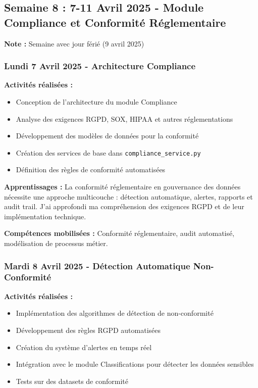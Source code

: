 \subsection{Semaine 8 : 7-11 Avril 2025 - Module Compliance et Conformité Réglementaire}

\textbf{Note :} Semaine avec jour férié (9 avril 2025)

\subsubsection{Lundi 7 Avril 2025 - Architecture Compliance}

\textbf{Activités réalisées :}
\begin{itemize}
    \item Conception de l'architecture du module Compliance
    \item Analyse des exigences RGPD, SOX, HIPAA et autres réglementations
    \item Développement des modèles de données pour la conformité
    \item Création des services de base dans \texttt{compliance\_service.py}
    \item Définition des règles de conformité automatisées
\end{itemize}

\textbf{Apprentissages :}
La conformité réglementaire en gouvernance des données nécessite une approche multicouche : détection automatique, alertes, rapports et audit trail. J'ai approfondi ma compréhension des exigences RGPD et de leur implémentation technique.

\textbf{Compétences mobilisées :}
Conformité réglementaire, audit automatisé, modélisation de processus métier.

\subsubsection{Mardi 8 Avril 2025 - Détection Automatique Non-Conformité}

\textbf{Activités réalisées :}
\begin{itemize}
    \item Implémentation des algorithmes de détection de non-conformité
    \item Développement des règles RGPD automatisées
    \item Création du système d'alertes en temps réel
    \item Intégration avec le module Classifications pour détecter les données sensibles
    \item Tests sur des datasets de conformité
\end{itemize}

